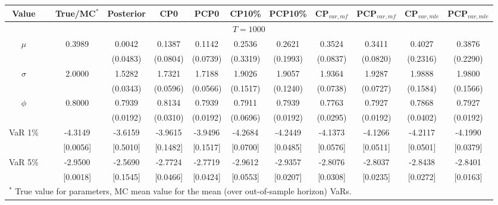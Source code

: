 { \renewcommand{\arraystretch}{1.2} 
{\footnotesize
\begin{sidewaystable} 
\center 
\begin{tabular}{cc cc cccc cccc} 
Value & & True/MC$^*$ & Posterior & CP0  & PCP0 & CP10\%  & PCP10\% &CP$_{var,mf}$ & PCP$_{var,mf}$ & CP$_{var,mle}$ & PCP$_{var,mle}$ \\ \hline 
\hline 
\multicolumn{12}{c}{$T =1000$}  \\ 
\hline 
\rowcolor{LightCyan} $\mu$&& 0.3989 & 0.0042 & 0.1387 & 0.1142 & 0.2536 & 0.2621 & 0.3524 & 0.3411 & 0.4027 & 0.3876  \\ 
&&   & (0.0483) & (0.0804) & (0.0739) & (0.3319) & (0.1993) &(0.0837) & (0.0820) & (0.2316) & (0.2290)  \\ 
\rowcolor{LightCyan} $\sigma$&& 2.0000 & 1.5282 & 1.7321 & 1.7188 & 1.9026 & 1.9057 & 1.9364 & 1.9287 & 1.9888 & 1.9800  \\ 
&&   & (0.0343) & (0.0596) & (0.0566) & (0.1517) & (0.1240) &(0.0738) & (0.0727) & (0.1584) & (0.1566)  \\ 
\rowcolor{LightCyan} $\phi$&& 0.8000 & 0.7939 & 0.8134 & 0.7939 & 0.7911 & 0.7939 & 0.7763 & 0.7927 & 0.7868 & 0.7927  \\ 
&&   & (0.0192) & (0.0310) & (0.0192) & (0.0696) & (0.0192) &(0.0295) & (0.0192) & (0.0402) & (0.0192)  \\ 
\rowcolor{LightCyan} VaR 1\% && -4.3149 & -3.6159 & -3.9615 & -3.9496 & -4.2684 & -4.2449 &-4.1373 & -4.1266 & -4.2117 & -4.1990 \\ 
  && [0.0056] & [0.5010] & [0.1482] & [0.1517] & [0.0700] & [0.0485] &[0.0576] & [0.0511] & [0.0501] & [0.0379]  \\ 
\rowcolor{LightCyan} VaR 5\% && -2.9500 & -2.5690 & -2.7724 & -2.7719 & -2.9612 & -2.9357 &-2.8076 & -2.8037 & -2.8438 & -2.8401 \\ 
  && [0.0018] & [0.1545] & [0.0466] & [0.0424] & [0.0553] & [0.0207] &[0.0308] & [0.0235] & [0.0272] & [0.0163]  \\ 
\hline 
\multicolumn{12}{l}{\footnotesize{$^*$ True value for parameters, MC mean value for the mean (over out-of-sample horizon) VaRs.}}  \\ 

\end{tabular}
\end{sidewaystable}}}
